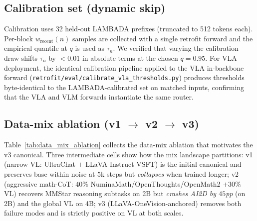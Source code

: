 \documentclass{article}
\begin{document}
\subsection{Calibration set (dynamic skip)}
\label{app:calibration}
Calibration uses 32 held-out LAMBADA prefixes (truncated to 512 tokens each). Per-block $w_{\text{recent}}(n)$ samples are collected with a single retrofit forward and the empirical quantile at $q$ is used as $\tau_n$. We verified that varying the calibration draw shifts $\tau_n$ by $<0.01$ in absolute terms at the chosen $q{=}0.95$. For VLA deployment, the identical calibration pipeline applied to the VLA in-backbone forward (\texttt{retrofit/eval/calibrate\_vla\_thresholds.py}) produces thresholds byte-identical to the LAMBADA-calibrated set on matched inputs, confirming that the VLA and VLM forwards instantiate the same router.

\subsection{Data-mix ablation (v1 $\to$ v2 $\to$ v3)}
\label{app:data_mix}

Table~\ref{tab:data_mix_ablation} collects the data-mix ablation that motivates the v3 canonical. Three intermediate cells show how the mix landscape partitions: v1 (narrow VL: UltraChat $+$ LLaVA-Instruct-VSFT) is the initial canonical and preserves base within noise at $5$k steps but \emph{collapses} when trained longer; v2 (aggressive math-CoT: $40\%$ NuminaMath/OpenThoughts/OpenMath2 $+ 30\%$ VL) recovers MMStar reasoning subtasks on 2B but \emph{crashes AI2D by $45$pp} (on 2B) and the global VL on 4B; v3 (LLaVA-OneVision-anchored) removes both failure modes and is strictly positive on VL at both scales.
\end{document}
